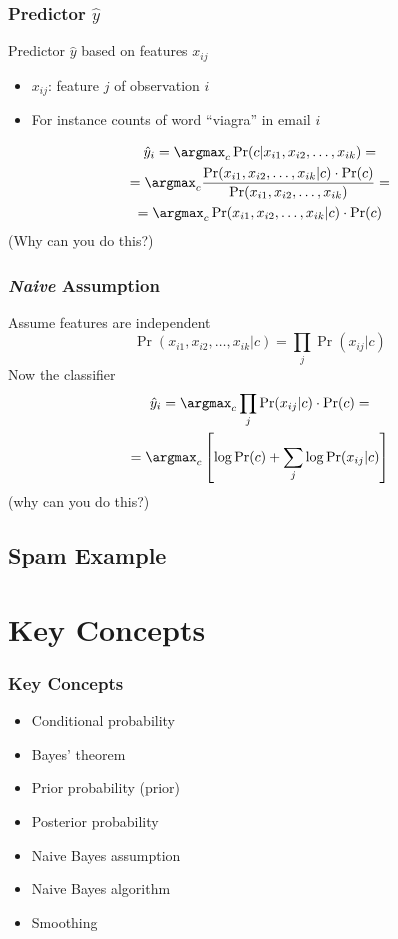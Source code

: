 \documentclass[mathserif, xcolor=table, svgnames]{beamer}
\begin{document}
\begin{frame}
  \frametitle{Predictor $\hat y$}
  Predictor $\hat y$ based on features $x_{ij}$
  \begin{itemize}
  \item $x_{ij}$: feature $j$ of observation $i$
  \item For instance counts of word ``viagra'' in email $i$
  \end{itemize}
  \begin{multline*}
    \hat y_{i} =
    \argmax_{c}
    \Pr(c|x_{i1}, x_{i2}, \dots, x_{ik}) =
    \\
    = \argmax_{c} 
    \frac{\Pr(x_{i1}, x_{i2}, \dots, x_{ik}|c) \cdot \Pr(c)}
    {\Pr(x_{i1}, x_{i2}, \dots, x_{ik})} =
    \\
    = \argmax_{c}
    \Pr(x_{i1}, x_{i2}, \dots, x_{ik}|c) \cdot \Pr(c)
  \end{multline*}
  (Why can you do this?)
\end{frame}

\begin{frame}
  \frametitle{\emph{Naive} Assumption}
  Assume features are independent
  \begin{equation*}
    \Pr(x_{i1}, x_{i2}, \dots, x_{ik}|c) =
    \prod_{j} \Pr(x_{ij}|c)
  \end{equation*}
  Now the classifier
  \begin{multline*}
      \hat y_{i} =
      \argmax_{c} \prod_{j} \Pr(x_{ij}|c) \cdot \Pr(c) =
      \\
      = \argmax_{c} \left[
      \log  \Pr(c) + \sum_{j} \log \Pr(x_{ij}|c)
    \right]
  \end{multline*}
  (why can you do this?)
\end{frame}

\subsection{Spam Example}
\frame{\tableofcontents[currentsubsection]}

{

}

\section{Key Concepts}
\frame{\tableofcontents[currentsection]}

\begin{frame}
  \frametitle{Key Concepts}
  \begin{itemize}
  \item Conditional probability
  \item Bayes' theorem
  \item Prior probability (prior)
  \item Posterior probability
  \item Naive Bayes assumption
  \item Naive Bayes algorithm
  \item Smoothing
  \end{itemize}
\end{frame}
 
\end{document}
